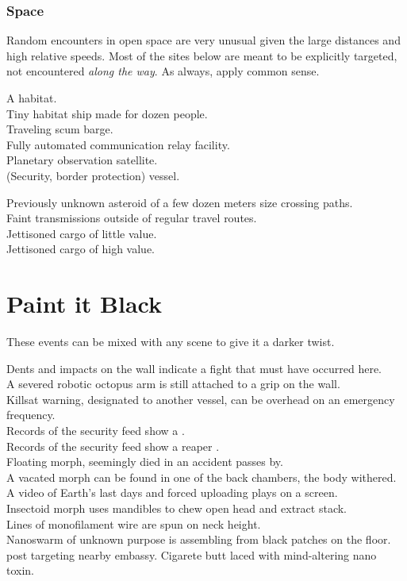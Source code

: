\documentclass[a4]{article}
\begin{document}
\subsubsection{Space}

Random encounters in open space are very unusual given the large distances and high relative speeds.
Most of the sites below are meant to be explicitly targeted, not encountered \textit{along the way}.
As always, apply common sense.

\starttableone
A habitat.\\
Tiny habitat ship made for dozen people.\\
Traveling scum barge.\\
Fully automated communication relay facility.\\
Planetary observation satellite.\\
(Security, border protection) vessel.\\
\stoptableone

\starttableone
Previously unknown asteroid of a few dozen meters size crossing paths.\\
Faint transmissions outside of regular travel routes.\\
Jettisoned cargo of little value.\\
Jettisoned cargo of high value.\\
\stoptableone



\section{Paint it Black}

These events can be mixed with any scene to give it a darker twist.

\starttableone
Dents and impacts on the wall indicate a fight that must have occurred here.\\
A severed robotic octopus arm is still attached to a grip on the wall.\\
Killsat warning, designated to another vessel, can be overhead on an emergency frequency.\\
Records of the security feed show a  .\\
Records of the security feed show a reaper .\\
Floating morph, seemingly died in an accident passes by.\\
A vacated morph can be found in one of the back chambers, the body withered.\\
A video of Earth's last days and forced uploading plays on a screen.\\
Insectoid morph uses mandibles to chew open head and extract stack.\\
Lines of monofilament wire are spun on neck height.\\
Nanoswarm of unknown purpose is assembling from black patches on the floor.\\
 post targeting nearby embassy.
Cigarete butt laced with mind-altering nano toxin.
\stoptableone
\end{document}
